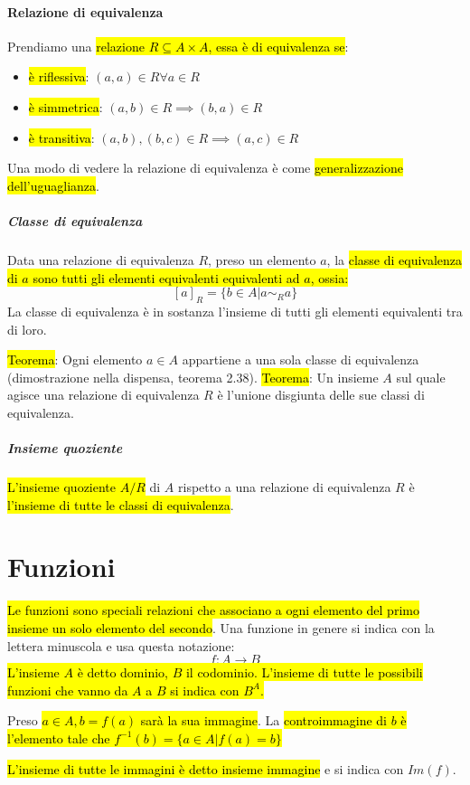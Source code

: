 \documentclass[a4paper,12pt,oneside]{article}
\begin{document}
\paragraph{Relazione di equivalenza} Prendiamo una \hl{relazione
$R \subseteq A \times A$, essa è di equivalenza se}:
\begin{itemize}
    \item \hl{è riflessiva}: $(a,a) \in R \forall a \in R$
    \item \hl{è simmetrica}: $(a,b) \in R \implies (b,a) \in R$
    \item \hl{è transitiva}: $(a,b), (b,c) \in R \implies (a,c) \in R$
\end{itemize}
Una modo di vedere la relazione di equivalenza è come \hl{generalizzazione
dell'uguaglianza}.

\subparagraph{Classe di equivalenza} Data una relazione di equivalenza $R$, preso
un elemento $a$, la \hl{classe di equivalenza di $a$ sono tutti gli elementi
equivalenti equivalenti ad $a$, ossia:}
    \[ {[a]}_R = \{ b \in A | a \sim_R a \} \]
La classe di equivalenza è in sostanza l'insieme di tutti gli elementi
equivalenti tra di loro.

\hl{Teorema}: Ogni elemento $a \in A$ appartiene a una sola classe di equivalenza
(dimostrazione nella dispensa, teorema 2.38).
\hl{Teorema}: Un insieme $A$ sul quale agisce una relazione di equivalenza $R$
è l'unione disgiunta delle sue classi di equivalenza.

\subparagraph{Insieme quoziente} \hl{L'insieme quoziente $A/R$} di $A$ rispetto
a una relazione di equivalenza $R$ è \hl{l'insieme di tutte le classi di
equivalenza}.

\section{Funzioni}
\hl{Le funzioni sono speciali relazioni che associano a ogni elemento del
primo insieme un solo elemento del secondo}. Una funzione in genere si indica
con la lettera minuscola e usa questa notazione: \[ f: A \to B \]
\hl{L'insieme $A$ è detto dominio, $B$ il codominio. L'insieme di tutte le
possibili funzioni che vanno da $A$ a $B$ si indica con $B^A$.}

Preso \hl{$a \in A, b = f(a)$ sarà la sua immagine}. La \hl{controimmagine
di $b$ è l'elemento tale che $f^{-1}(b) = \{ a \in A | f(a) = b \}$}

\hl{L'insieme di tutte le immagini è detto insieme immagine} e si indica con
$Im(f)$.
\end{document}
